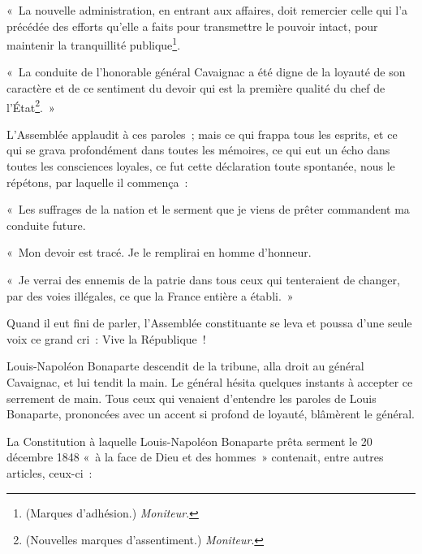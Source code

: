 \documentclass[french,twoside]{book} %
\newenvironment{quoteblock}%
  {\begin{quoting}}
  {\end{quoting}}
\newenvironment{quotebar}{%
    \def\FrameCommand{{\color{rubric!10!}\vrule width 0.5em} \hspace{0.9em}}%
    \def\OuterFrameSep{\itemsep} %
    \MakeFramed {\advance\hsize-\width \FrameRestore}
  }%
  {%
    \endMakeFramed
  }
\renewenvironment{quoteblock}%
  {%
    \savenotes
    \setstretch{0.9}
    \normalfont
    \begin{quotebar}
  }
  {%
    \end{quotebar}
    \spewnotes
  }
\begin{document}
\begin{quoteblock}
 \noindent « La nouvelle administration, en entrant aux affaires, doit remercier celle qui l’a précédée des efforts qu’elle a faits pour transmettre le pouvoir intact, pour maintenir la tranquillité publique\footnote{(Marques d’adhésion.) \emph{Moniteur}.}.\par
 « La conduite de l’honorable général Cavaignac a été digne de la loyauté de son caractère et de ce sentiment du devoir qui est la première qualité du chef de l’État\footnote{(Nouvelles marques d’assentiment.) \emph{Moniteur}.}. »
 \end{quoteblock}

\noindent L’Assemblée applaudit à ces paroles ; mais ce qui frappa tous les esprits, et ce qui se grava profondément dans toutes les mémoires, ce qui eut un écho dans toutes les consciences loyales, ce fut cette déclaration toute spontanée, nous le répétons, par laquelle il commença :\par

\begin{quoteblock}
 \noindent « Les suffrages de la nation et le serment que je viens de prêter commandent ma conduite future.\par
 « Mon devoir est tracé. Je le remplirai en homme d’honneur.\par
 « Je verrai des ennemis de la patrie dans tous ceux qui tenteraient de changer, par des voies illégales, ce que la France entière a établi. »
 \end{quoteblock}

\noindent Quand il eut fini de parler, l’Assemblée constituante se leva et poussa d’une seule voix ce grand cri : Vive la République !\par
Louis-Napoléon Bonaparte descendit de la tribune, alla droit au général Cavaignac, et lui tendit la main. Le général hésita quelques instants à accepter ce serrement de main. Tous ceux qui venaient d’entendre les paroles de Louis Bonaparte, prononcées avec un accent si profond de loyauté, blâmèrent le général.\par
La Constitution à laquelle Louis-Napoléon Bonaparte prêta serment le 20 décembre 1848 « à la face de Dieu et des hommes » contenait, entre autres articles, ceux-ci :\par
\end{document}
